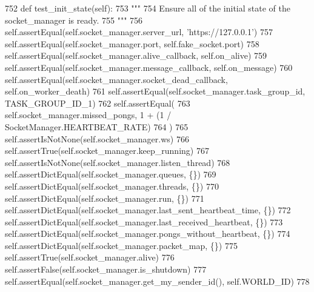 \begin{DoxyCode}
752     \textcolor{keyword}{def }test\_init\_state(self):
753         \textcolor{stringliteral}{"""}
754 \textcolor{stringliteral}{        Ensure all of the initial state of the socket\_manager is ready.}
755 \textcolor{stringliteral}{        """}
756         self.assertEqual(self.socket\_manager.server\_url, \textcolor{stringliteral}{'https://127.0.0.1'})
757         self.assertEqual(self.socket\_manager.port, self.fake\_socket.port)
758         self.assertEqual(self.socket\_manager.alive\_callback, self.on\_alive)
759         self.assertEqual(self.socket\_manager.message\_callback, self.on\_message)
760         self.assertEqual(self.socket\_manager.socket\_dead\_callback, self.on\_worker\_death)
761         self.assertEqual(self.socket\_manager.task\_group\_id, TASK\_GROUP\_ID\_1)
762         self.assertEqual(
763             self.socket\_manager.missed\_pongs, 1 + (1 / SocketManager.HEARTBEAT\_RATE)
764         )
765         self.assertIsNotNone(self.socket\_manager.ws)
766         self.assertTrue(self.socket\_manager.keep\_running)
767         self.assertIsNotNone(self.socket\_manager.listen\_thread)
768         self.assertDictEqual(self.socket\_manager.queues, \{\})
769         self.assertDictEqual(self.socket\_manager.threads, \{\})
770         self.assertDictEqual(self.socket\_manager.run, \{\})
771         self.assertDictEqual(self.socket\_manager.last\_sent\_heartbeat\_time, \{\})
772         self.assertDictEqual(self.socket\_manager.last\_received\_heartbeat, \{\})
773         self.assertDictEqual(self.socket\_manager.pongs\_without\_heartbeat, \{\})
774         self.assertDictEqual(self.socket\_manager.packet\_map, \{\})
775         self.assertTrue(self.socket\_manager.alive)
776         self.assertFalse(self.socket\_manager.is\_shutdown)
777         self.assertEqual(self.socket\_manager.get\_my\_sender\_id(), self.WORLD\_ID)
778 
\end{DoxyCode}
\mbox{\label{classparlai_1_1mturk_1_1core_1_1legacy__2018_1_1test_1_1test__socket__manager_1_1TestSocketManagerRoutingFunctionality_accadf3cf8227495252f6ffe440cb7528}} 

